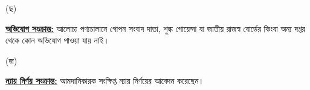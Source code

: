 \documentclass[12pt]{article}
\begin{document}
\begin{minipage}[t]{0.05\linewidth}
\hspace{1em}
\end{minipage}
\begin{minipage}[t]{0.05\linewidth}
(ছ)
\end{minipage}
\begin{minipage}[t]{0.90\linewidth}
\underline{\textbf{অভিযোগ সংক্রান্ত:}} আলোচ্য পণ্যচালানে
গোপন সংবাদ দাতা, শুল্ক গোয়েন্দা বা
জাতীয় রাজস্ব বোর্ডের কিংবা অন্য দপ্তর থেকে
কোন অভিযোগ পাওয়া যায় নাই।
\\
\end{minipage}
\begin{minipage}[t]{0.05\linewidth}
\hspace{1em}
\end{minipage}
\begin{minipage}[t]{0.05\linewidth}
(জ)
\end{minipage}
\begin{minipage}[t]{0.90\linewidth}
\underline{\textbf{ন্যায় নির্ণয় সংক্রান্ত:}} আমদানিকারক সংক্ষিপ্ত ন্যায় নির্ণয়ের আবেদন করেছেন।
\\
\end{minipage}
\end{document}
